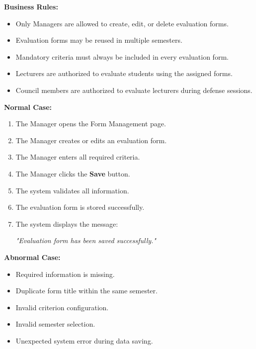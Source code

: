 \vspace{0.2cm}

\textbf{Business Rules:}

\begin{itemize}
    \item Only Managers are allowed to create, edit, or delete evaluation forms.
    \item Evaluation forms may be reused in multiple semesters.
    \item Mandatory criteria must always be included in every evaluation form.
    \item Lecturers are authorized to evaluate students using the assigned forms.
    \item Council members are authorized to evaluate lecturers during defense sessions.
\end{itemize}

\vspace{0.2cm}

\textbf{Normal Case:}

\begin{enumerate}
    \item The Manager opens the Form Management page.
    \item The Manager creates or edits an evaluation form.
    \item The Manager enters all required criteria.
    \item The Manager clicks the \textbf{Save} button.
    \item The system validates all information.
    \item The evaluation form is stored successfully.
    \item The system displays the message:

    \textit{"Evaluation form has been saved successfully."}
\end{enumerate}

\vspace{0.2cm}

\textbf{Abnormal Case:}

\begin{itemize}
    \item Required information is missing.
    \item Duplicate form title within the same semester.
    \item Invalid criterion configuration.
    \item Invalid semester selection.
    \item Unexpected system error during data saving.
\end{itemize}

